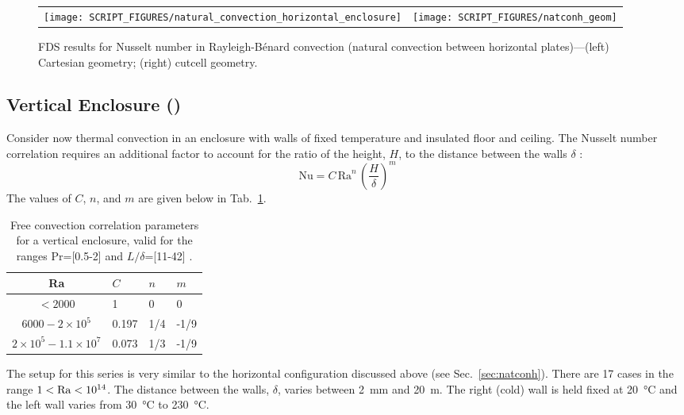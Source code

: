 \documentclass[11pt]{book}
\begin{document}
\begin{figure}[h]
   \centering
   \begin{tabular*}{\textwidth}{lr}
       \texttt{[image: SCRIPT\_FIGURES/natural\_convection\_horizontal\_enclosure]} &
       \texttt{[image: SCRIPT\_FIGURES/natconh\_geom]} \\
   \end{tabular*}
   \caption[Nusselt correlation Rayleigh-B\'{e}nard convection]{\label{fig_natconh} FDS results for Nusselt number in Rayleigh-B\'{e}nard convection (natural convection between horizontal plates)---(left) Cartesian geometry; (right) cutcell geometry.}
\end{figure}

\FloatBarrier


\subsection{Vertical Enclosure (\texorpdfstring{}{natconv})}
\label{sec:natconv}

Consider now thermal convection in an enclosure with walls of fixed temperature and insulated floor and ceiling.  The Nusselt number correlation requires an additional factor to account for the ratio of the height, $H$, to the distance between the walls $\delta$ \cite{Holman:2}:
\begin{equation}
\mathrm{Nu} = C \,\mathrm{Ra}^n \,\left(\frac{H}{\delta}\right)^m
\end{equation}
The values of $C$, $n$, and $m$ are given below in Tab.~\ref{tab:freeconv}.
\begin{table}[h]
\centering
\caption[Free convection correlation parameters for a vertical enclosure]{Free convection correlation parameters for a vertical enclosure, valid for the ranges Pr=[0.5-2] and $L/\delta$=[11-42] \cite{Holman:2}.}
\label{tab:freeconv}
\begin{tabular}{clll}
Ra                                   & $C$    & $n$ & $m$  \\
\hline
$<2000$                              & 1      & 0   & 0    \\
$6000 - 2 \times 10^5$               & 0.197  & 1/4 & -1/9 \\
$2 \times 10^5 - 1.1 \times 10^7$    & 0.073  & 1/3 & -1/9
\end{tabular}
\end{table}
The setup for this series is very similar to the horizontal configuration discussed above (see Sec.~\ref{sec:natconh}). There are 17 cases in the range $1 < {\rm Ra} < 10^{14}$.  The distance between the walls, $\delta$, varies between 2~mm  and 20~m. The right (cold) wall is held fixed at 20~\si{\degreeCelsius} and the left wall varies from 30~\si{\degreeCelsius} to 230~\si{\degreeCelsius}.
\end{document}
